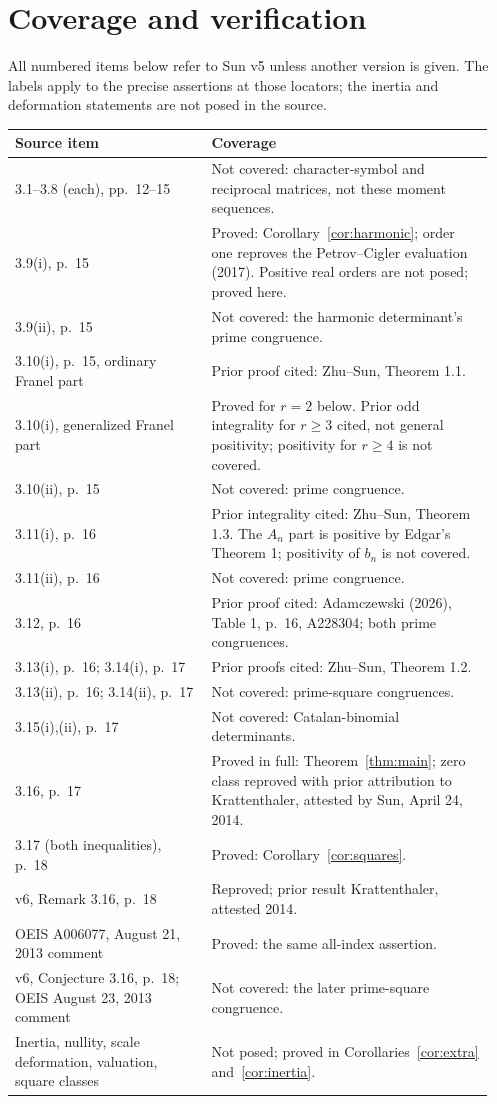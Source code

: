 \documentclass[11pt]{article}
\begin{document}
\section{Coverage and verification}
All numbered items below refer to Sun v5 unless another version is given.
The labels apply to the precise assertions at those locators; the
inertia and deformation statements are not posed in the source.
\small
\begin{longtable}{@{}p{0.39\linewidth}p{0.56\linewidth}@{}}
\toprule
Source item & Coverage \\
\midrule
3.1--3.8 (each), pp.~12--15 & Not covered: character-symbol and reciprocal matrices, not these moment sequences. \\
3.9(i), p.~15 & Proved: Corollary~\ref{cor:harmonic}; order one reproves the Petrov--Cigler evaluation (2017)\cite{harmonic}. Positive real orders are not posed; proved here. \\
3.9(ii), p.~15 & Not covered: the harmonic determinant's prime congruence. \\
3.10(i), p.~15, ordinary Franel part & Prior proof cited: Zhu--Sun, Theorem 1.1\cite{zhusun}. \\
3.10(i), generalized Franel part & Proved for $r=2$ below. Prior odd integrality for $r\geq3$ cited, not general positivity; positivity for $r\geq4$ is not covered. \\
3.10(ii), p.~15 & Not covered: prime congruence. \\
3.11(i), p.~16 & Prior integrality cited: Zhu--Sun, Theorem 1.3. The $A_n$ part is positive by Edgar's Theorem 1; positivity of $b_n$ is not covered. \\
3.11(ii), p.~16 & Not covered: prime congruence. \\
3.12, p.~16 & Prior proof cited: Adamczewski (2026), Table 1, p.~16, A228304\cite{adamczewski}; both prime congruences. \\
3.13(i), p.~16; 3.14(i), p.~17 & Prior proofs cited: Zhu--Sun, Theorem 1.2. \\
3.13(ii), p.~16; 3.14(ii), p.~17 & Not covered: prime-square congruences. \\
3.15(i),(ii), p.~17 & Not covered: Catalan-binomial determinants. \\
3.16, p.~17 & Proved in full: Theorem~\ref{thm:main}; zero class reproved with prior attribution to Krattenthaler, attested by Sun, April 24, 2014. \\
3.17 (both inequalities), p.~18 & Proved: Corollary~\ref{cor:squares}. \\
v6, Remark 3.16, p.~18 & Reproved; prior result Krattenthaler, attested 2014. \\
OEIS A006077, August 21, 2013 comment & Proved: the same all-index assertion. \\
v6, Conjecture 3.16, p.~18; OEIS August 23, 2013 comment & Not covered: the later prime-square congruence. \\
Inertia, nullity, scale deformation, valuation, square classes & Not posed; proved in Corollaries~\ref{cor:extra} and~\ref{cor:inertia}. \\
\bottomrule
\end{longtable}
\end{document}
